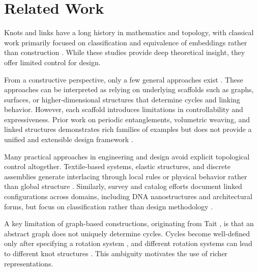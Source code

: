 \documentclass[acmtog,anonymous,review]{acmart}
\begin{document}
\section{Related Work}
\label{sec:related}

Knots and links have a long history in mathematics and topology, with classical work primarily focused on classification and equivalence of embeddings rather than construction \citep{tait1877knots,rolfsen1976knots,adams1994knot,tait1877links,conway1970enumeration,neuwirth1979theory}. While these studies provide deep theoretical insight, they offer limited control for design.

From a constructive perspective, only a few general approaches exist \citep{tait1877knots,akleman2015extended,akleman2020topologically,akleman2015block}. These approaches can be interpreted as relying on underlying scaffolds such as graphs, surfaces, or higher-dimensional structures that determine cycles and linking behavior. However, each scaffold introduces limitations in controllability and expressiveness. Prior work on periodic entanglements, volumetric weaving, and linked structures demonstrates rich families of examples but does not provide a unified and extensible design framework \citep{evans2013periodiceentanglement1,evans2013periodiceentanglement2,yildiz2025woven,yildiz2025linked}.

Many practical approaches in engineering and design avoid explicit topological control altogether. Textile-based systems, elastic structures, and discrete assemblies generate interlacing through local rules or physical behavior rather than global structure \citep{borhani2016material,borhani2016emergence,kozlov2013structures,liu2025doublelayeredegridshells,ren2021curvedribbons,verhoeff2011chainlinkfence,roelofs2007rings,yang2025topologicalwovennodes}. Similarly, survey and catalog efforts document linked configurations across domains, including DNA nanostructures and architectural forms, but focus on classification rather than design methodology \citep{glaser2021dnananostructures,kozlov2018knots,gailiunas2022tplinks}.

A key limitation of graph-based constructions, originating from Tait \citep{tait1877knots}, is that an abstract graph does not uniquely determine cycles. Cycles become well-defined only after specifying a rotation system \citep{edmonds1960combinatorial}, and different rotation systems can lead to different knot structures \citep{gross2001topological,akleman1999}. This ambiguity motivates the use of richer representations.
\end{document}
